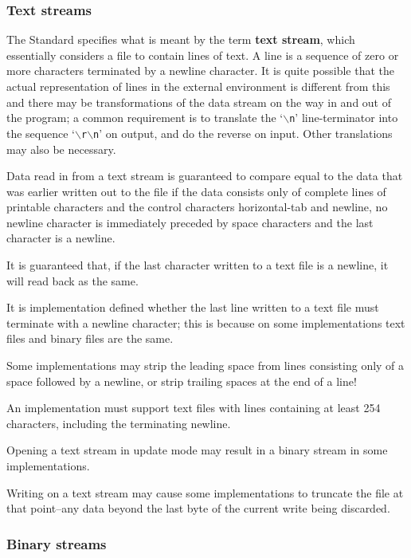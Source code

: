    \subsubsection{Text streams}
    

    The Standard specifies what is meant by the term \textbf{text stream},
     which essentially considers a file to contain lines of text.  A line is
     a sequence of zero or more characters terminated by a newline character.
     It is quite possible that the actual representation of lines in the
     external environment is different from this and there may be
     transformations of the data stream on the way in and out of the program;
     a common requirement is to translate the `\texttt{$\backslash$n}'
     line-terminator into the sequence `\texttt{$\backslash$r$\backslash$n}' on output, and
     do the reverse on input.  Other translations may also be necessary.


    Data read in from a text stream is guaranteed to compare equal to the
     data that was earlier written out to the file if the data consists only of
     complete lines of printable characters and the control characters
     horizontal-tab and newline, no newline character is immediately preceded
     by space characters and the last character is a newline.


    It is guaranteed that, if the last character written to a text file is
     a newline, it will read back as the same.


    It is implementation defined whether the last line written to a text
     file must terminate with a newline character; this is because on some
     implementations text files and binary files are the same.


    Some implementations may strip the leading space from lines consisting
     only of a space followed by a newline, or strip trailing spaces at the end
     of a line!


    An implementation must support text files with lines containing at least
     254 characters, including the terminating newline.


    Opening a text stream in update mode may result in a binary stream in
     some implementations.


    Writing on a text stream may cause some implementations to truncate the
     file at that point--any data beyond the last byte of the current write
     being discarded.


   

   \subsubsection{Binary streams}
    

